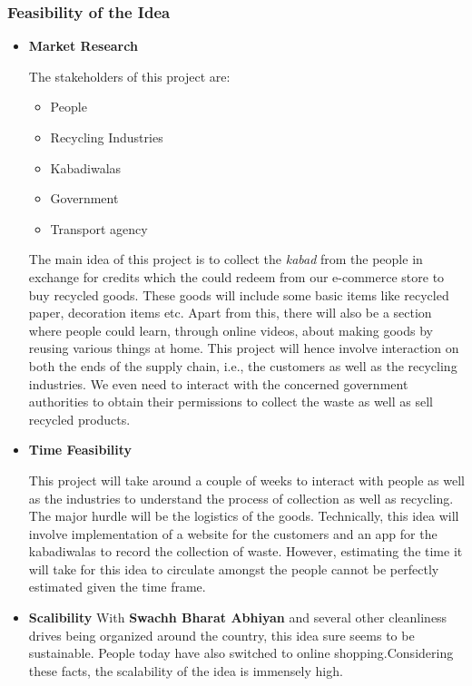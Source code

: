 \documentclass{article}
\begin{document}
\subsubsection{Feasibility of the Idea}
\begin{itemize}
    \item \textbf{Market Research}
    \par The stakeholders of this project are:
    \begin{itemize}
        \item People
        \item Recycling Industries
        \item Kabadiwalas
        \item Government
        \item Transport agency
    \end{itemize}
    The main idea of this project is to collect the \textit{kabad} from the people in exchange for credits which the could redeem from our e-commerce store to buy recycled goods. These goods will include some basic items like recycled paper, decoration items etc. Apart from this, there will also be a section where people could learn, through online videos, about making goods by reusing various things at home. This project will hence involve interaction on both the ends of the supply chain, i.e., the customers as well as the recycling industries. We even need to interact with the concerned government authorities to obtain their permissions to collect the waste as well as sell recycled products.
    \item \textbf{Time Feasibility}
    \par This project will take around a couple of weeks to interact with people as well as the industries to understand the process of collection as well as recycling. The major hurdle will be the logistics of the goods. Technically, this idea will involve implementation of a website for the customers and an app for the kabadiwalas to record the collection of waste. However, estimating the time it will take for this idea to circulate amongst the people cannot be perfectly estimated given the time frame.
    \item \textbf{Scalibility}
    With \textbf{Swachh Bharat Abhiyan} and several other cleanliness drives being organized around the country, this idea sure seems to be sustainable. People today have also switched to online shopping.Considering these facts, the scalability of the idea is immensely high.
    
\end{itemize}
\end{document}
